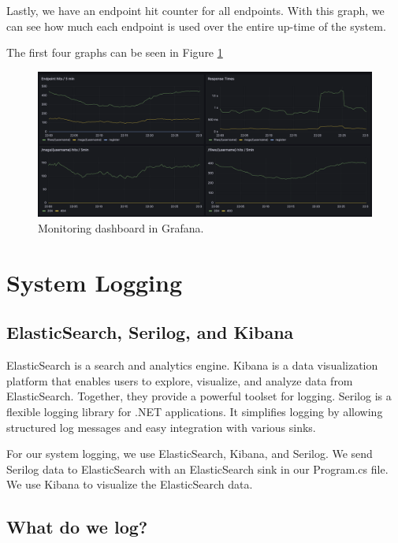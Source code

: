 Lastly, we have an endpoint hit counter for all endpoints. With this graph, we can see how much each endpoint is used over the entire up-time of the system.

The first four graphs can be seen in Figure \ref{fig:grafana}

\begin{figure}[h]
    \centering
    \includegraphics[width=1\textwidth]{report/source/images/grafana.png}
    \caption{Monitoring dashboard in Grafana.}
    \label{fig:grafana}
\end{figure}


\newpage
\section{System Logging}

\subsection{ElasticSearch, Serilog, and Kibana}

ElasticSearch is a search and analytics engine. Kibana is a data visualization platform that enables users to explore, visualize, and analyze data from ElasticSearch. Together, they provide a powerful toolset for logging.
Serilog is a flexible logging library for .NET applications. It simplifies logging by allowing structured log messages and easy integration with various sinks.

For our system logging, we use ElasticSearch, Kibana, and Serilog. We send Serilog data to ElasticSearch with an ElasticSearch sink in our Program.cs file. We use Kibana to visualize the ElasticSearch data.

\subsection{What do we log?}


